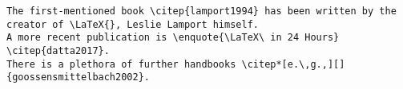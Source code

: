 \inputminted[breaklines]{bibtex}{exercises/literature/literature.done.bib}

\begin{verbatim}
The first-mentioned book \citep{lamport1994} has been written by the creator of \LaTeX{}, Leslie Lamport himself.
A more recent publication is \enquote{\LaTeX\ in 24 Hours} \citep{datta2017}.
There is a plethora of further handbooks \citep*[e.\,g.,][]{goossensmittelbach2002}.



\end{verbatim}
